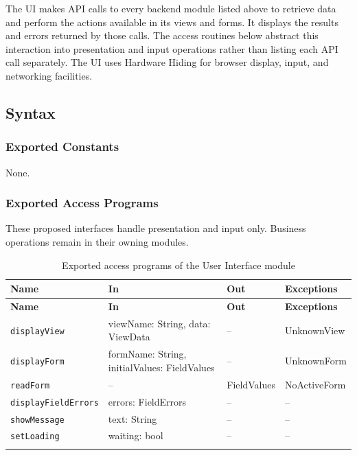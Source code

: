 \documentclass[12pt, titlepage]{article}
\begin{document}
The UI makes API calls to every backend module listed above to retrieve data and perform the actions available in its views and forms. It displays the results and errors returned by those calls. The access routines below abstract this interaction into presentation and input operations rather than listing each API call separately. The UI uses Hardware Hiding for browser display, input, and networking facilities.

\subsection{Syntax}

\subsubsection{Exported Constants}
None.

\subsubsection{Exported Access Programs}

These proposed interfaces handle presentation and input only. Business operations remain in their owning modules.

\begingroup
\small
\setlength{\tabcolsep}{4pt}
\renewcommand{\arraystretch}{1.2}
\begin{longtable}{>{\raggedright\arraybackslash}p{}
                  >{\raggedright\arraybackslash}p{}
                  >{\raggedright\arraybackslash}p{}
                  >{\raggedright\arraybackslash}p{}}
\toprule
\textbf{Name} & \textbf{In} & \textbf{Out} & \textbf{Exceptions} \\
\midrule
\endfirsthead
\toprule
\textbf{Name} & \textbf{In} & \textbf{Out} & \textbf{Exceptions} \\
\midrule
\endhead
\endfoot
\texttt{displayView} & viewName: String, data: ViewData & -- & UnknownView \\
\texttt{displayForm} & formName: String, initialValues: FieldValues & -- & UnknownForm \\
\texttt{readForm} & -- & FieldValues & NoActiveForm \\
\texttt{displayFieldErrors} & errors: FieldErrors & -- & -- \\
\texttt{showMessage} & text: String & -- & -- \\
\texttt{setLoading} & waiting: bool & -- & -- \\
\bottomrule
\caption{Exported access programs of the User Interface module}
\label{TblUIAccessPrograms}
\end{longtable}
\endgroup
\end{document}
